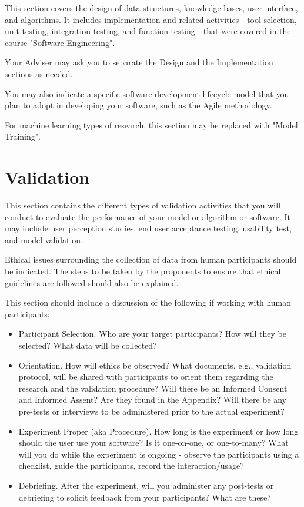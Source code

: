 This section covers the design of data structures, knowledge bases, user interface, and algorithms. It includes implementation and related activities - tool selection, unit testing, integration testing, and function testing - that were covered in the course "Software Engineering".

Your Adviser may ask you to separate the Design and the Implementation sections as needed. 

You may also indicate a specific software development lifecycle model that you plan to adopt in developing your software, such as the Agile methodology.

For machine learning types of research, this section may be replaced with "Model Training".

\section{Validation}

This section contains the different types of validation activities that you will conduct to evaluate the performance of your model or algorithm or software. It may include user perception studies, end user acceptance testing, usability test, and model validation.

Ethical issues surrounding the collection of data from human participants should be indicated. The steps to be taken by the proponents to ensure that ethical guidelines are followed should also be explained.

This section should include a discussion of the following if working with human participants:
\begin{itemize}
    \item Participant Selection. Who are your target participants? How will they be selected? What data will be collected?
    \item Orientation. How will ethics be observed? What documents, e.g., validation protocol, will be shared with participants to orient them regarding the research and the validation procedure? Will there be an Informed Consent and Informed Assent? Are they found in the Appendix? Will there be any pre-tests or interviews to be administered prior to the actual experiment?
    \item Experiment Proper (aka Procedure). How long is the experiment or how long should the user use your software? Is it one-on-one, or one-to-many? What will you do while the experiment is ongoing - observe the participants using a checklist, guide the participants, record the interaction/usage?
    \item Debriefing. After the experiment, will you administer any post-tests or debriefing to solicit feedback from your participants? What are these?
\end{itemize}

